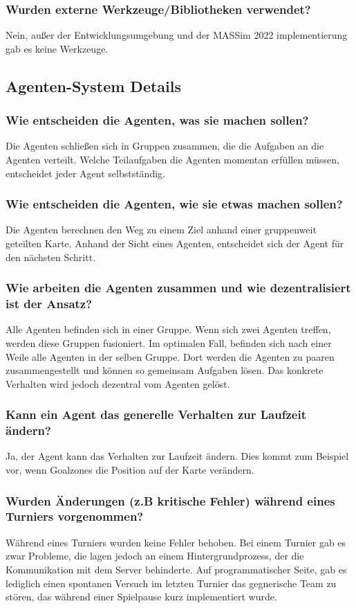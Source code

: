 \subsubsection{Wurden externe Werkzeuge/Bibliotheken verwendet?}
Nein, außer der Entwicklungsumgebung und der MASSim 2022 implementierung gab es keine Werkzeuge.
\subsection{Agenten-System Details}
\subsubsection{Wie entscheiden die Agenten, was sie machen sollen?}
Die Agenten schließen sich in Gruppen zusammen, die die Aufgaben an die Agenten verteilt. Welche Teilaufgaben die Agenten momentan erfüllen müssen, entscheidet jeder Agent selbstständig.
\subsubsection{Wie entscheiden die Agenten, wie sie etwas machen sollen?}
Die Agenten berechnen den Weg zu einem Ziel anhand einer gruppenweit geteilten Karte. Anhand der Sicht eines Agenten, entscheidet sich der Agent für den nächsten Schritt.
\subsubsection{Wie arbeiten die Agenten zusammen und wie dezentralisiert ist der Ansatz?}
Alle Agenten befinden sich in einer Gruppe. Wenn sich zwei Agenten treffen, werden diese Gruppen fusioniert. Im optimalen Fall, befinden sich nach einer Weile alle Agenten in der selben Gruppe. Dort werden die Agenten zu paaren zusammengestellt und können so gemeinsam Aufgaben lösen. Das konkrete Verhalten wird jedoch dezentral vom Agenten gelöst.
\subsubsection{Kann ein Agent das generelle Verhalten zur Laufzeit ändern?}
Ja, der Agent kann das Verhalten zur Laufzeit ändern. Dies kommt zum Beispiel vor, wenn Goalzones die Position auf der Karte verändern.
\subsubsection{Wurden Änderungen (z.B kritische Fehler) während eines Turniers vorgenommen?}
Während eines Turniers wurden keine Fehler behoben. Bei einem Turnier gab es zwar Probleme, die lagen jedoch an einem Hintergrundprozess, der die Kommunikation mit dem Server behinderte.
Auf programmatischer Seite, gab es lediglich einen spontanen Versuch im letzten Turnier das gegnerische Team zu stören, das während einer Spielpause kurz implementiert wurde.
